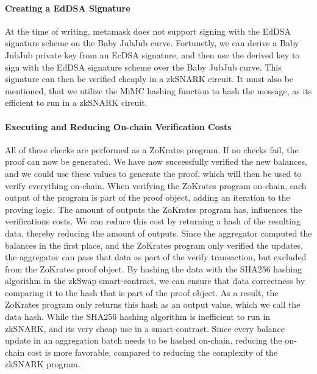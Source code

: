 \documentclass[../../thesis.tex]{subfiles}
\begin{document}
\paragraph{Creating a EdDSA Signature}
At the time of writing, metamask does not support signing with the EdDSA signature scheme on the Baby JubJub curve. Fortunetly, we can derive a Baby JubJub private key from an EcDSA signature, and then use the derived key to sign with the EdDSA signature scheme over the Baby JubJub curve. This signature can then be verified cheaply in a zkSNARK circuit. It must also be mentioned, that we utilize the MiMC hashing function to hash the message, as its efficient to run in a zkSNARK circuit. 

\paragraph{Executing and Reducing On-chain Verification Costs} \label{exec_and_reduce}
All of these checks are performed as a ZoKrates program. If no checks fail, the proof can now be generated.  We have now successfully verified the new balances, and we could use these values to generate the proof, which will then be used to verify everything on-chain. When verifying the ZoKrates program on-chain, each output of the program is part of the proof object, adding an iteration to the proving logic. The amount of outputs the ZoKrates program has, influences the verifications costs. We can reduce this cost by returning a hash of the resulting data, thereby reducing the amount of outputs. Since the aggregator computed the balances in the first place, and the ZoKrates program only verified the updates, the aggregator can pass that data as part of the verify transaction, but excluded from the ZoKrates proof object. By hashing the data with the SHA256 hashing algorithm in the zkSwap smart-contract, we can ensure that data correctness by comparing it to the hash that is part of the proof object. As a result, the ZoKrates program only returns this hash as an output value, which we call the data hash. While the SHA256 hashing algorithm is inefficient to run in zkSNARK, and its very cheap use in a smart-contract. Since every balance update in an aggregation batch needs to be hashed on-chain, reducing the on-chain cost is more favorable, compared to reducing the complexity of the zkSNARK program. 
\end{document}

